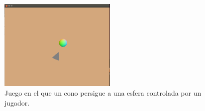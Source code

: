 \begin{figure}[!htbp!]
\centering
\includegraphics[width=0.5\textwidth]{gameia}
\caption[Programa de prueba 4]{Juego en el que un cono persigue a una esfera controlada por un jugador.}
\label{fig:gameia}
\end{figure}
